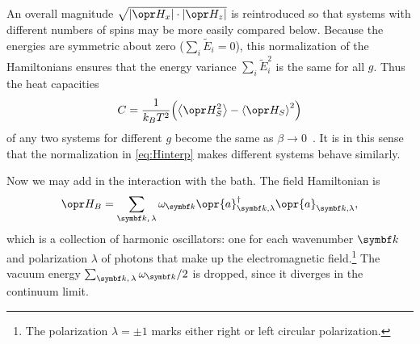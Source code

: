 \documentclass[../thesis.tex]{subfiles}
\begin{document}
An overall magnitude $\sqrt{\abs{\ham_x}\cdot\abs{\ham_z}}$ is reintroduced so
that systems with different numbers of spins may be more easily compared below.
Because the energies are symmetric about zero ($\sum_i \tilde{E}_i = 0$), this
normalization of the Hamiltonians ensures that the energy variance $\sum_i
\tilde{E}_i^2$ is the same for all $g$. Thus the heat capacities
\begin{equation}
  C
  = \frac{1}{k_B T^2}\qty(\ev{\ham_S^2} - \ev{\ham_S}^2)
\end{equation}
of any two systems for different $g$ become the same as $\beta \to
0$~\cite[p.~112]{kardarStatisticalPhysicsParticles2007}. It is in this sense
that the normalization in \cref{eq:Hinterp} makes different systems behave
similarly.

Now we may add in the interaction with the bath. The field Hamiltonian is
\begin{equation}
  \ham_B
  = \sum_{\vq{k},\, \lambda} \omega_{\vq{k}}
  \opr{a}^\dag_{\vq{k},\lambda}\opr{a}_{\vq{k},\lambda},
  \label{eq:bath-hamiltonian}
\end{equation}
which is a collection of harmonic oscillators: one for each wavenumber $\vq{k}$
and polarization $\lambda$ of photons that make up the electromagnetic
field.\footnote{%
  The polarization $\lambda = \pm 1$ marks either right or left circular
  polarization.
}
The vacuum energy $\sum_{\vq{k},\, \lambda} \omega_{\vq{k}} / 2$ is dropped,
since it diverges in the continuum limit.
\end{document}
